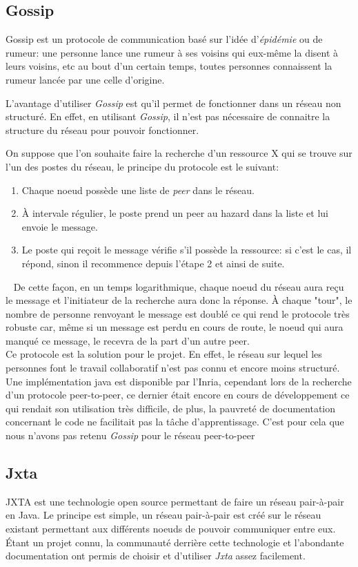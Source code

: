 	\subsection{Gossip}
	
		Gossip est un protocole de communication basé sur l'idée
		d'\emph{épidémie} ou de rumeur: une personne lance une rumeur à ses
		voisins qui eux-même la disent à leurs voisins, etc au bout d'un certain
		temps, toutes personnes connaissent la rumeur lancée par une celle
		d'origine.
		
		L'avantage d'utiliser \emph{Gossip} est qu'il permet de fonctionner dans
		un réseau non structuré. En effet, en utilisant \emph{Gossip}, il n'est
		pas nécessaire de connaitre la structure du réseau pour pouvoir
		fonctionner.
		
		On suppose que l'on souhaite faire la recherche d'un ressource X qui se
		trouve sur l'un des postes du réseau, le principe du protocole est le
		suivant:
		\begin{enumerate}
			\item Chaque noeud possède une liste de \emph{peer} dans le réseau.
			\item À intervale régulier, le poste prend un peer au hazard dans la
			liste et lui envoie le message.
			\item Le poste qui reçoit le message vérifie s'il possède la
			ressource: si c'est le cas, il répond, sinon il recommence depuis
			l'étape 2 et ainsi de suite.
		\end{enumerate}~
		De cette façon, en un temps logarithmique, chaque noeud du réseau aura
		reçu le message et l'initiateur de la recherche aura donc la réponse. À
		chaque "tour", le nombre de personne renvoyant le message est doublé ce
		qui rend le protocole très robuste car, même si un message est perdu en
		cours de route, le noeud qui aura manqué ce message, le recevra de la
		part d'un autre peer.\\
		
		Ce protocole est la solution pour le projet. En effet, le réseau sur
		lequel les personnes font le travail collaboratif n'est pas connu et
		encore moins structuré. Une implémentation java est disponible par
		l'Inria, cependant lors de la recherche d'un protocole peer-to-peer, ce
		dernier était encore en cours de développement ce qui rendait son
		utilisation très difficile, de plus, la pauvreté de documentation
		concernant le code ne facilitait pas la tâche d'apprentissage. C'est
		pour cela que nous n'avons pas retenu \emph{Gossip} pour le réseau
		peer-to-peer
	
	\subsection{Jxta}
		JXTA est une technologie open source permettant de faire un réseau
		pair-à-pair en Java. Le principe est simple, un réseau pair-à-pair est
		créé sur le réseau existant permettant aux différents noeuds de pouvoir
		communiquer entre eux.\\
		
		Étant un projet connu, la communauté derrière cette technologie et
		l'abondante documentation ont permis de choisir et d'utiliser
		\emph{Jxta} assez facilement.